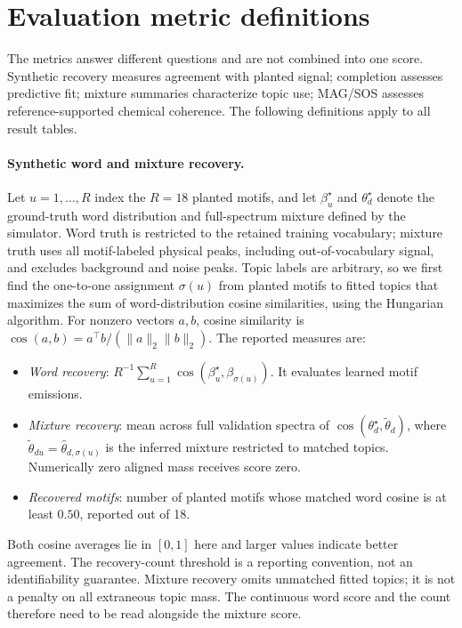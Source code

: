 \documentclass[10pt,a4paper]{article}
\begin{document}
\section{Evaluation metric definitions}
\label{sec:metrics}

The metrics answer different questions and are not combined into one score.
Synthetic recovery measures agreement with planted signal; completion assesses
predictive fit; mixture summaries characterize topic use; MAG/SOS assesses
reference-supported chemical coherence. The following definitions apply to
all result tables.

\paragraph{Synthetic word and mixture recovery.}
Let $u=1,\ldots,R$ index the $R=18$ planted motifs, and let
$\beta^{\star}_u$ and $\theta^{\star}_d$ denote the ground-truth word
distribution and full-spectrum mixture defined by the simulator.
Word truth is restricted to the retained training vocabulary; mixture truth
uses all motif-labeled physical peaks, including out-of-vocabulary signal,
and excludes background and noise peaks.
Topic labels are arbitrary, so we first find the one-to-one assignment
$\sigma(u)$ from planted motifs to fitted topics that maximizes the sum of
word-distribution cosine similarities, using the Hungarian algorithm.
For nonzero vectors $a,b$, cosine similarity is
$\cos(a,b)=a^\top b/(\lVert a\rVert_2\lVert b\rVert_2)$.
The reported measures are:
\begin{itemize}
\item \emph{Word recovery}: $R^{-1}\sum_{u=1}^R
\cos(\beta^{\star}_u,\beta_{\sigma(u)})$. It evaluates learned motif emissions.
\item \emph{Mixture recovery}: mean across full validation spectra of
$\cos(\theta^{\star}_d,\widetilde\theta_d)$, where
$\widetilde\theta_{du}=\widehat\theta_{d,\sigma(u)}$ is the inferred mixture
restricted to matched topics. Numerically zero aligned mass receives score zero.
\item \emph{Recovered motifs}: number of planted motifs whose matched word
cosine is at least $0.50$, reported out of 18.
\end{itemize}
Both cosine averages lie in $[0,1]$ here and larger values indicate better
agreement. The recovery-count threshold is a reporting convention, not an
identifiability guarantee. Mixture recovery omits unmatched fitted topics;
it is not a penalty on all extraneous topic mass. The continuous word score
and the count therefore need to be read alongside the mixture score.
\end{document}
